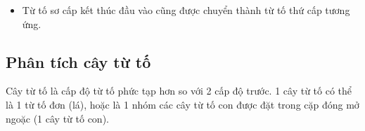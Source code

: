 \begin{itemize}
  
  \item Từ tố sơ cấp kết thúc đầu vào cũng được chuyển thành từ tố thứ cấp tương ứng.
  
  
  
\end{itemize}

\subsection{Phân tích cây từ tố}
Cây từ tố là cấp độ từ tố phức tạp hơn so với 2 cấp độ trước. 1 cây từ tố có thể là 1 từ tố đơn (lá), hoặc là 1 nhóm các cây từ tố con được đặt trong cặp đóng mở ngoặc (1 cây từ tố con).


